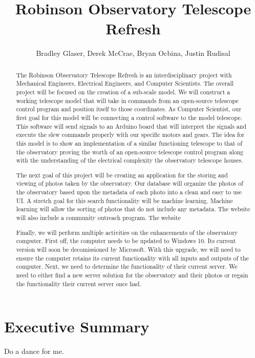 \documentclass[12pt]{report}
\title{Robinson Observatory Telescope Refresh}
\author{Bradley Glaser, Derek McCrae, Bryan Ocbina, Justin Rudisal}
\begin{document}
\onehalfspacing

\maketitle

\begin{abstract}
The Robinson Observatory Telescope Refresh is an interdisciplinary project with Mechanical Engineers, Electrical Engineers, and Computer Scientists. The overall project will be focused on the creation of a sub-scale model. We will construct a working telescope model that will take in commands from an open-source telescope control program and position itself to those coordinates. As Computer Scientist, our first goal for this model will be connecting a control software to the model telescope. This software will send signals to an Arduino board that will interpret the signals and execute the slew commands properly with our specific motors and gears. The idea for this model is to show an implementation of a similar functioning telescope to that of the observatory proving the worth of an open-source telescope control program along with the understanding of the electrical complexity the observatory telescope houses.

The next goal of this project will be creating an application for the storing and viewing of photos taken by the observatory. Our database will organize the photos of the observatory based upon the metadata of each photo into a clean and easy to use UI. A stretch goal for this search functionality will be machine learning. Machine learning will allow the sorting of photos that do not include any metadata. The website will also include a community outreach program. The website

Finally, we will perform multiple activities on the enhancements of the observatory computer. First off, the computer needs to be updated to Windows 10. Its current version will soon be decomissioned by Microsoft. With this upgrade, we will need to ensure the computer retains its current functionality with all inputs and outputs of the computer. Next, we need to determine the functionality of their current server. We need to either find a new server solution for the observatory and their photos or regain the functionality their current server once had.

\end{abstract}

\section*{Executive Summary}
Do a dance for me.
\end{document}
